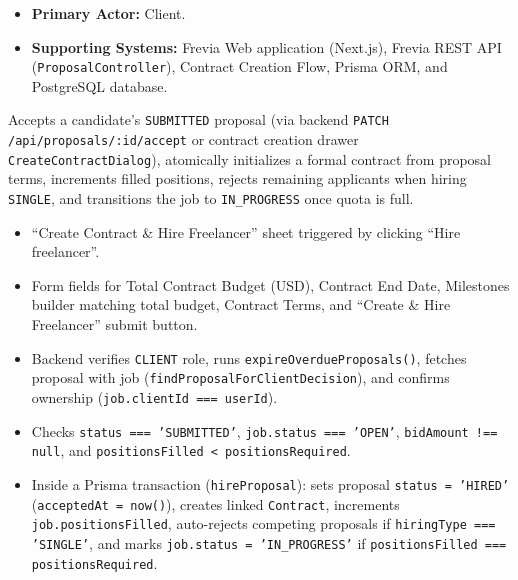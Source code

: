 
\begin{itemize}[leftmargin=1.6em,topsep=3pt,itemsep=2pt,parsep=0pt,label=$\bullet$]
    \item \textbf{Primary Actor:} Client.
    \item \textbf{Supporting Systems:} Frevia Web application (Next.js), Frevia REST API (\texttt{ProposalController}), Contract Creation Flow, Prisma ORM, and PostgreSQL database.
\end{itemize}

\noindent Accepts a candidate's \texttt{SUBMITTED} proposal (via backend \texttt{PATCH /api/proposals/:id/accept} or contract creation drawer \texttt{CreateContractDialog}), atomically initializes a formal contract from proposal terms, increments filled positions, rejects remaining applicants when hiring \texttt{SINGLE}, and transitions the job to \texttt{IN\_PROGRESS} once quota is full.

\begin{itemize}[leftmargin=1.6em,topsep=3pt,itemsep=2pt,parsep=0pt,label=$\bullet$]
    \item ``Create Contract \& Hire Freelancer'' sheet triggered by clicking ``Hire freelancer''.
    \item Form fields for Total Contract Budget (USD), Contract End Date, Milestones builder matching total budget, Contract Terms, and ``Create \& Hire Freelancer'' submit button.
\end{itemize}

\begin{itemize}[leftmargin=1.6em,topsep=3pt,itemsep=2pt,parsep=0pt,label=$\bullet$]
    \item Backend verifies \texttt{CLIENT} role, runs \texttt{expireOverdueProposals()}, fetches proposal with job (\texttt{findProposalForClientDecision}), and confirms ownership (\texttt{job.clientId === userId}).
    \item Checks \texttt{status === 'SUBMITTED'}, \texttt{job.status === 'OPEN'}, \texttt{bidAmount !== null}, and \texttt{positionsFilled < positionsRequired}.
    \item Inside a Prisma transaction (\texttt{hireProposal}): sets proposal \texttt{status = 'HIRED'} (\texttt{acceptedAt = now()}), creates linked \texttt{Contract}, increments \texttt{job.positionsFilled}, auto-rejects competing proposals if \texttt{hiringType === 'SINGLE'}, and marks \texttt{job.status = 'IN\_PROGRESS'} if \texttt{positionsFilled === positionsRequired}.
\end{itemize}

